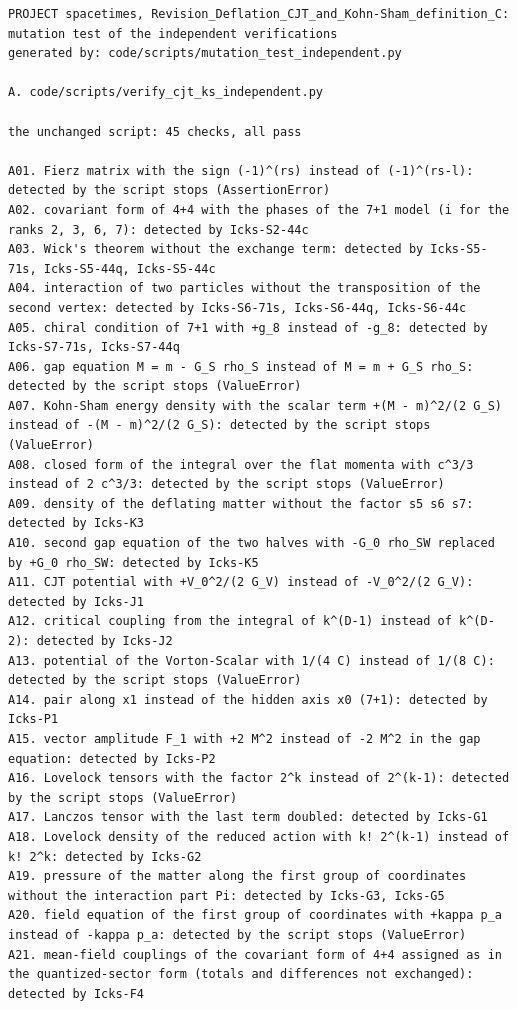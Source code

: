\documentclass[
  10pt,
]{article}
\begin{document}
\begin{verbatim}
PROJECT spacetimes, Revision_Deflation_CJT_and_Kohn-Sham_definition_C: mutation test of the independent verifications
generated by: code/scripts/mutation_test_independent.py

A. code/scripts/verify_cjt_ks_independent.py

the unchanged script: 45 checks, all pass

A01. Fierz matrix with the sign (-1)^(rs) instead of (-1)^(rs-l): detected by the script stops (AssertionError)
A02. covariant form of 4+4 with the phases of the 7+1 model (i for the ranks 2, 3, 6, 7): detected by Icks-S2-44c
A03. Wick's theorem without the exchange term: detected by Icks-S5-71s, Icks-S5-44q, Icks-S5-44c
A04. interaction of two particles without the transposition of the second vertex: detected by Icks-S6-71s, Icks-S6-44q, Icks-S6-44c
A05. chiral condition of 7+1 with +g_8 instead of -g_8: detected by Icks-S7-71s, Icks-S7-44q
A06. gap equation M = m - G_S rho_S instead of M = m + G_S rho_S: detected by the script stops (ValueError)
A07. Kohn-Sham energy density with the scalar term +(M - m)^2/(2 G_S) instead of -(M - m)^2/(2 G_S): detected by the script stops (ValueError)
A08. closed form of the integral over the flat momenta with c^3/3 instead of 2 c^3/3: detected by the script stops (ValueError)
A09. density of the deflating matter without the factor s5 s6 s7: detected by Icks-K3
A10. second gap equation of the two halves with -G_0 rho_SW replaced by +G_0 rho_SW: detected by Icks-K5
A11. CJT potential with +V_0^2/(2 G_V) instead of -V_0^2/(2 G_V): detected by Icks-J1
A12. critical coupling from the integral of k^(D-1) instead of k^(D-2): detected by Icks-J2
A13. potential of the Vorton-Scalar with 1/(4 C) instead of 1/(8 C): detected by the script stops (ValueError)
A14. pair along x1 instead of the hidden axis x0 (7+1): detected by Icks-P1
A15. vector amplitude F_1 with +2 M^2 instead of -2 M^2 in the gap equation: detected by Icks-P2
A16. Lovelock tensors with the factor 2^k instead of 2^(k-1): detected by the script stops (ValueError)
A17. Lanczos tensor with the last term doubled: detected by Icks-G1
A18. Lovelock density of the reduced action with k! 2^(k-1) instead of k! 2^k: detected by Icks-G2
A19. pressure of the matter along the first group of coordinates without the interaction part Pi: detected by Icks-G3, Icks-G5
A20. field equation of the first group of coordinates with +kappa p_a instead of -kappa p_a: detected by the script stops (ValueError)
A21. mean-field couplings of the covariant form of 4+4 assigned as in the quantized-sector form (totals and differences not exchanged): detected by Icks-F4

\end{verbatim}
\end{document}
